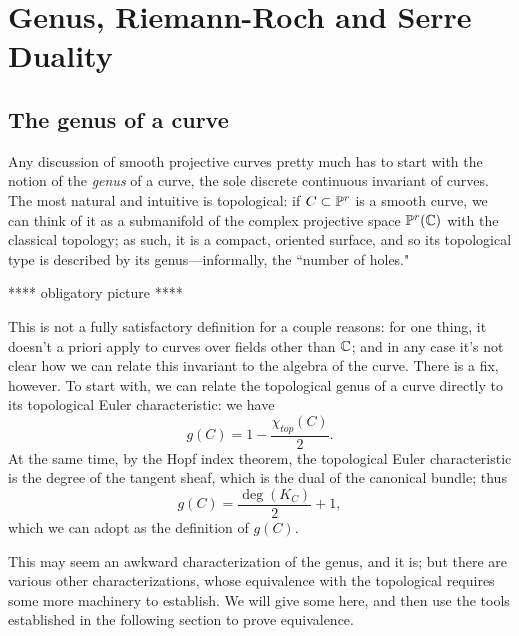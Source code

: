 \section{Genus, Riemann-Roch and Serre Duality}

\subsection{The genus of a curve}

Any discussion of smooth projective curves pretty much has to start with the notion of the \emph{genus} of a curve, the sole discrete continuous invariant of curves. The most natural and intuitive is topological: if $C \subset \PP^r$ is a smooth curve, we can think of it as a submanifold of the complex projective space $\PP^r(\CC)$ with the classical topology; as such, it is a compact, oriented surface, and so its topological type is described by its genus---informally, the ``number of holes."

**** obligatory picture ****

This is not a fully satisfactory definition for a couple reasons: for one thing, it doesn't a priori apply to curves over fields other than $\CC$; and in any case it's not clear how we can relate this invariant to the algebra of the curve. There is a fix, however. To start with, we can relate the topological genus of a curve directly to its topological Euler characteristic: we have
$$
g(C) = 1 - \frac{\chi_{top}(C)}{2}.
$$
At the same time, by the Hopf index theorem, the topological Euler characteristic is the degree of the tangent sheaf, which is the dual of the canonical bundle; thus
$$
g(C) = \frac{\deg(K_C)}{2} + 1,
$$
which we can adopt as the definition of $g(C)$.

This may seem an awkward characterization of the genus, and it is; but there are various other characterizations, whose equivalence with the topological requires some more machinery to establish. We will give some here, and then use the tools established in the following section to prove equivalence.

